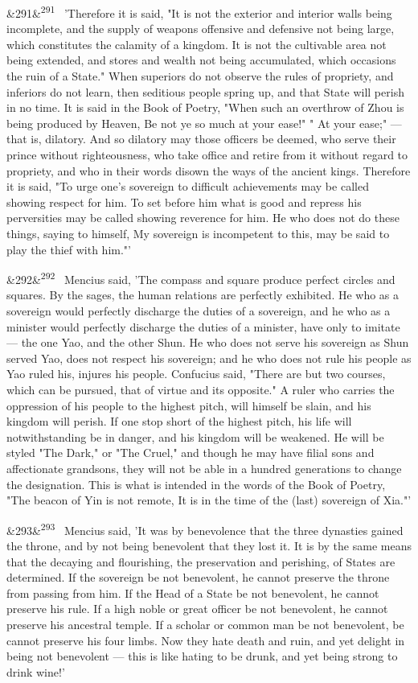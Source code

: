\documentclass[12pt]{article}
\newcommand{\para}[1][]{\par\noindent\ifx&#1&\else\textsuperscript{\footnotesize #1}~\fi}
\begin{document}
\para[291] 'Therefore it is said, "It is not the exterior and interior walls being incomplete, and the supply of weapons offensive and defensive not being large, which constitutes the calamity of a kingdom. It is not the cultivable area not being extended, and stores and wealth not being accumulated, which occasions the ruin of a State." When superiors do not observe the rules of propriety, and inferiors do not learn, then seditious people spring up, and that State will perish in no time. It is said in the Book of Poetry, "When such an overthrow of Zhou is being produced by Heaven, Be not ye so much at your ease!" " At your ease;" --- that is, dilatory. And so dilatory may those officers be deemed, who serve their prince without righteousness, who take office and retire from it without regard to propriety, and who in their words disown the ways of the ancient kings. Therefore it is said, "To urge one's sovereign to difficult achievements may be called showing respect for him. To set before him what is good and repress his perversities may be called showing reverence for him. He who does not do these things, saying to himself, My sovereign is incompetent to this, may be said to play the thief with him."'

\para[292] Mencius said, 'The compass and square produce perfect circles and squares. By the sages, the human relations are perfectly exhibited. He who as a sovereign would perfectly discharge the duties of a sovereign, and he who as a minister would perfectly discharge the duties of a minister, have only to imitate --- the one Yao, and the other Shun. He who does not serve his sovereign as Shun served Yao, does not respect his sovereign; and he who does not rule his people as Yao ruled his, injures his people. Confucius said, "There are but two courses, which can be pursued, that of virtue and its opposite." A ruler who carries the oppression of his people to the highest pitch, will himself be slain, and his kingdom will perish. If one stop short of the highest pitch, his life will notwithstanding be in danger, and his kingdom will be weakened. He will be styled "The Dark," or "The Cruel," and though he may have filial sons and affectionate grandsons, they will not be able in a hundred generations to change the designation. This is what is intended in the words of the Book of Poetry, "The beacon of Yin is not remote, It is in the time of the (last) sovereign of Xia."'

\para[293] Mencius said, 'It was by benevolence that the three dynasties gained the throne, and by not being benevolent that they lost it. It is by the same means that the decaying and flourishing, the preservation and perishing, of States are determined. If the sovereign be not benevolent, he cannot preserve the throne from passing from him. If the Head of a State be not benevolent, he cannot preserve his rule. If a high noble or great officer be not benevolent, he cannot preserve his ancestral temple. If a scholar or common man be not benevolent, be cannot preserve his four limbs. Now they hate death and ruin, and yet delight in being not benevolent --- this is like hating to be drunk, and yet being strong to drink wine!'
\end{document}
